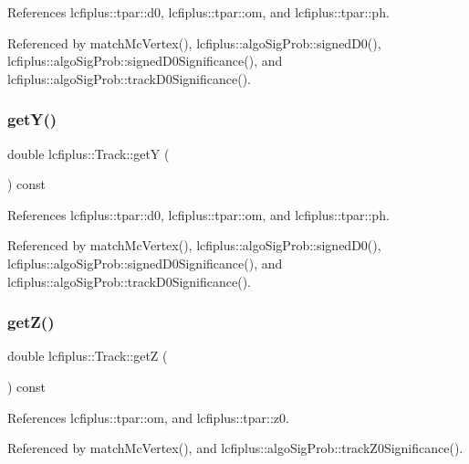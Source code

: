 References lcfiplus\+::tpar\+::d0, lcfiplus\+::tpar\+::om, and lcfiplus\+::tpar\+::ph.



Referenced by match\+Mc\+Vertex(), lcfiplus\+::algo\+Sig\+Prob\+::signed\+D0(), lcfiplus\+::algo\+Sig\+Prob\+::signed\+D0\+Significance(), and lcfiplus\+::algo\+Sig\+Prob\+::track\+D0\+Significance().

\mbox{\label{classlcfiplus_1_1Track_ab601773008cb8a620f7c45924259e1bb}} 
\subsubsection{get\+Y()}
{\footnotesize\ttfamily double lcfiplus\+::\+Track\+::getY (\begin{DoxyParamCaption}{ }\end{DoxyParamCaption}) const}



References lcfiplus\+::tpar\+::d0, lcfiplus\+::tpar\+::om, and lcfiplus\+::tpar\+::ph.



Referenced by match\+Mc\+Vertex(), lcfiplus\+::algo\+Sig\+Prob\+::signed\+D0(), lcfiplus\+::algo\+Sig\+Prob\+::signed\+D0\+Significance(), and lcfiplus\+::algo\+Sig\+Prob\+::track\+D0\+Significance().

\mbox{\label{classlcfiplus_1_1Track_a69f956d19002a9072f2805840bf4c059}} 
\subsubsection{get\+Z()}
{\footnotesize\ttfamily double lcfiplus\+::\+Track\+::getZ (\begin{DoxyParamCaption}{ }\end{DoxyParamCaption}) const}



References lcfiplus\+::tpar\+::om, and lcfiplus\+::tpar\+::z0.



Referenced by match\+Mc\+Vertex(), and lcfiplus\+::algo\+Sig\+Prob\+::track\+Z0\+Significance().

\mbox{\label{classlcfiplus_1_1Track_a344efcf0a2a904506a8f8128c6a8a9e8}} 
